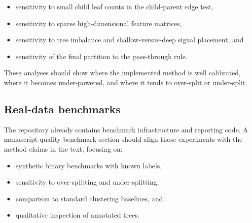 \begin{itemize}[leftmargin=1.5em]
  \item sensitivity to small child leaf counts in the child-parent edge test,
  \item sensitivity to sparse high-dimensional feature matrices,
  \item sensitivity to tree imbalance and shallow-versus-deep signal placement, and
  \item sensitivity of the final partition to the pass-through rule.
\end{itemize}

These analyses should show where the implemented method is well calibrated,
where it becomes under-powered, and where it tends to over-split or
under-split.

\subsection{Real-data benchmarks}

The repository already contains benchmark infrastructure and reporting code. A
manuscript-quality benchmark section should align those experiments with the
method claims in the text, focusing on:

\begin{itemize}[leftmargin=1.5em]
  \item synthetic binary benchmarks with known labels,
  \item sensitivity to over-splitting and under-splitting,
  \item comparison to standard clustering baselines, and
  \item qualitative inspection of annotated trees.
\end{itemize}
